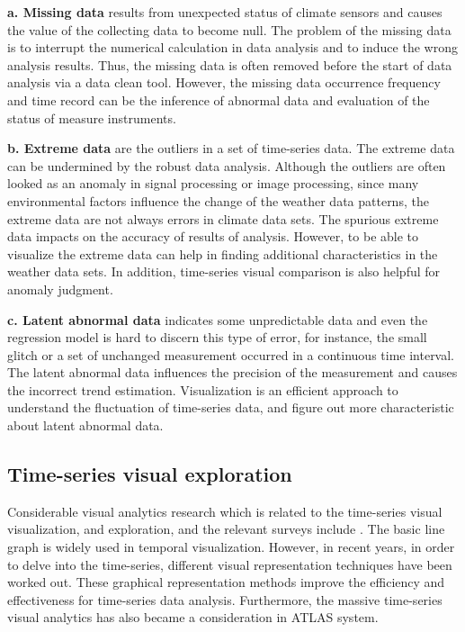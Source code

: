 \documentclass{vgtc}                          %
\begin{document}
{\bf a. Missing data} results from unexpected status of climate sensors and causes the value of the collecting data to become null. The problem of the missing data is to interrupt the numerical calculation in data analysis and to induce the wrong analysis results. Thus, the missing data is often removed before the start of data analysis via a data clean tool. However, the missing data occurrence frequency and time record can be the inference of abnormal data and evaluation of the status of measure instruments. 

{\bf b. Extreme data} are the outliers \cite{rousseeuw2005robust}in a set of time-series data. The extreme data can be undermined by the robust data analysis. Although the outliers are often looked as an anomaly in signal processing or image processing, since many environmental factors influence the change of the weather data patterns, the extreme data are not always errors in climate data sets. The spurious extreme data impacts on the accuracy of results of analysis. However, to be able to visualize the extreme data can help in finding additional characteristics in the weather data sets. In addition, time-series visual comparison is also helpful for anomaly judgment.
 
{\bf c. Latent abnormal data} indicates some unpredictable data and even the regression model is hard to discern this type of error, for instance, the small glitch or a set of unchanged measurement occurred in a continuous time interval. The latent abnormal data influences the precision of the measurement and causes the incorrect trend estimation. Visualization is an efficient approach to understand the fluctuation of time-series data, and figure out more characteristic about latent abnormal data.

\subsection{Time-series visual exploration}

Considerable visual analytics research which is related to the time-series visual visualization, and exploration, and the relevant surveys include \cite{silva2000visualization}. The basic line graph \cite{tufte1983visual} is widely used in temporal visualization. However, in recent years, in order to delve into the time-series, different visual representation techniques have been worked out\cite{bremm2011interactive,mclachlan2008liverac,javed2010stack,Sip2012,Liao2010,Liao2011}. These graphical representation methods improve the efficiency and effectiveness for time-series data analysis. Furthermore, the massive time-series visual analytics has also became a consideration in ATLAS \cite{chan2008maintaining} system.
 
\end{document}
